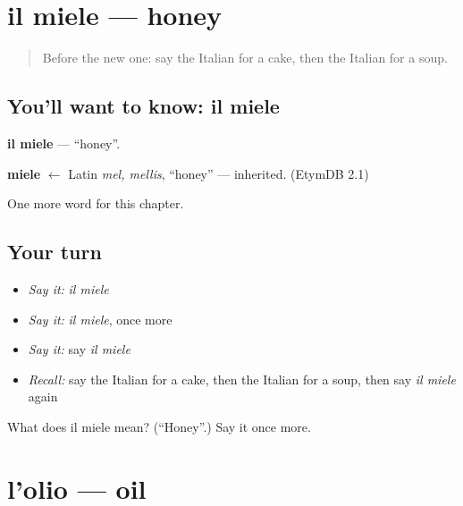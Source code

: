 \section[il miele]{il miele — honey}

\label{lesson:IT-C54-miele}



\begin{quote}
Before the new one: say the Italian for a cake, then the Italian for a soup.
\end{quote}

\subsection*{You'll want to know: il miele}
\textbf{il miele} — \textquotedblleft{}honey\textquotedblright{}.

\begin{cousinweb}
\textbf{miele} $\leftarrow$ Latin \emph{mel, mellis}, \textquotedblleft{}honey\textquotedblright{} — inherited. (EtymDB 2.1)
\end{cousinweb}

\begin{grammarlens}[title={What you've built}]
One more word for this chapter.
\end{grammarlens}

\subsection*{Your turn}
\begin{itemize}
\raggedright
  \item \emph{Say it:} \emph{il miele}
  \item \emph{Say it:} \emph{il miele}, once more
  \item \emph{Say it:} say \emph{il miele}
  \item \emph{Recall:} say the Italian for a cake, then the Italian for a soup, then say \emph{il miele} again
\end{itemize}

\begin{tcolorbox}[breakable,colback=teal!4,colframe=teal!35!black,title={Before you move on}]
What does il miele mean? (\textquotedblleft{}Honey\textquotedblright{}.) Say it once more.
\end{tcolorbox}
\section[l'olio]{l'olio — oil}


